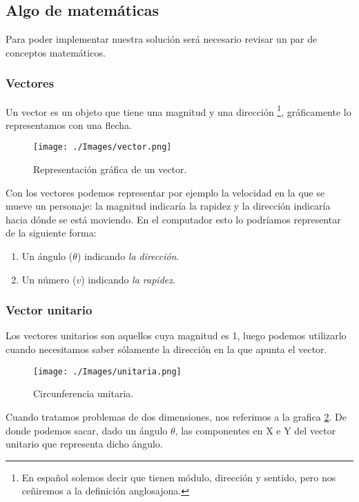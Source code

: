 \newpage
\clearpage 
\subsection{Algo de matemáticas}

Para poder implementar nuestra solución será necesario revisar un par de conceptos matemáticos. 

\subsubsection{Vectores}

Un vector es un objeto que tiene una magnitud y una dirección \cite{introVectors} \footnote{En español solemos decir que tienen módulo, dirección y sentido, pero nos ceñiremos a la definición anglosajona.}, gráficamente lo representamos con una flecha.
 
 \begin{figure}[h!]
 	\centering
 	\texttt{[image: ./Images/vector.png]}
 	\caption{Representación gráfica de un vector.}
 	\label{vector}
 \end{figure}

Con los vectores podemos representar por ejemplo la velocidad en la que se mueve un personaje: la magnitud indicaría la rapidez y la dirección indicaría hacia dónde se está moviendo. En el computador esto lo podríamos representar de la siguiente forma:

\begin{enumerate}
\item Un ángulo ($\theta$) indicando \emph{la dirección}.

\item Un número ($v$) indicando \emph{la rapidez}.
\end{enumerate}


\subsubsection{Vector unitario}

Los vectores unitarios son aquellos cuya magnitud es 1, luego podemos utilizarlo cuando necesitamos saber sólamente la dirección en la que apunta el vector.

\begin{figure}[h!]
	\centering
	\texttt{[image: ./Images/unitaria.png]}
	\caption{Circunferencia unitaria.}
	\label{unitaria}
\end{figure}


Cuando tratamos problemas de dos dimensiones, nos referimos a la grafica \ref{unitaria}. De donde podemos sacar, dado un ángulo $\theta$, las componentes en X e Y del vector unitario que representa dicho ángulo.

